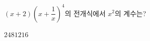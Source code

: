 $(x+2)\left(x+\dfrac{1}{x}\right)^4$의 전개식에서 $x^2$의 계수는?
\begin{choices32}{$2$}{$4$}{$8$}{$12$}{$16$}\end{choices32}
